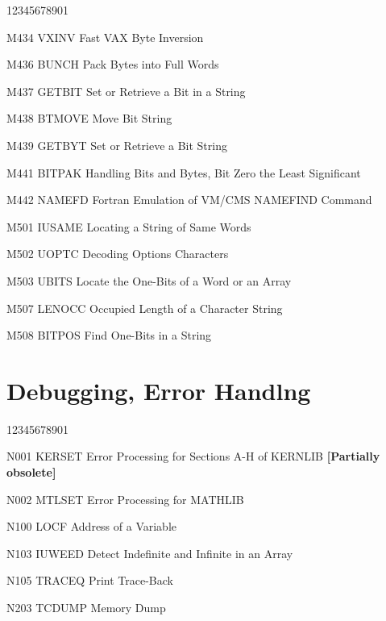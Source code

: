 \begin{DLtt}{12345678901}
\item[M434 VXINV] Fast VAX Byte Inversion
\item[M436 BUNCH] Pack Bytes into Full Words
\item[M437 GETBIT] Set or Retrieve a Bit in a String
\item[M438 BTMOVE] Move Bit String
\item[M439 GETBYT] Set or Retrieve a Bit String
\item[M441 BITPAK] Handling Bits and Bytes, Bit Zero the Least
Significant
\item[M442 NAMEFD] Fortran Emulation of VM/CMS NAMEFIND Command
\item[M501 IUSAME] Locating a String of Same Words
\item[M502 UOPTC] Decoding Options Characters
\item[M503 UBITS] Locate the One-Bits of a Word or an Array
\item[M507 LENOCC] Occupied Length of a Character String
\item[M508 BITPOS] Find One-Bits in a String
\end{DLtt}
\section*{Debugging, Error Handlng}
\begin{DLtt}{12345678901}
\item[N001 KERSET] Error Processing for Sections A-H of KERNLIB
{\bf [Partially obsolete]}
\item[N002 MTLSET] Error Processing for MATHLIB
\item[N100 LOCF] Address of a Variable
\item[N103 IUWEED] Detect Indefinite and Infinite in an Array
\item[N105 TRACEQ] Print Trace-Back
\item[N203 TCDUMP] Memory Dump
\end{DLtt}
